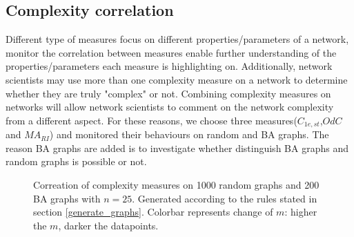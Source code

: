 \documentclass[12pt]{article}
\begin{document}
\subsection{Complexity correlation}
Different type of measures focus on different properties/parameters of a network, monitor the correlation between measures enable further understanding of the properties/parameters each measure is highlighting on. Additionally, network scientists may use more than one complexity measure on a network to determine whether they are truly "complex" or not. Combining complexity measures on networks will allow network scientists to comment on the network complexity from a different aspect. For these reasons, we choose three measures($C_{1e,st}$,$OdC$ and $MA_{RI}$) and monitored their behaviours on random and BA graphs. The reason BA graphs are added is to investigate whether distinguish BA graphs and random graphs is possible or not.\\
\begin{figure}[h!]
    \caption{Correation of complexity measures on 1000 random graphs and 200 BA graphs with $n=25$. Generated according to the rules stated in section \ref{generate_graphs}. Colorbar represents change of $m$: higher the $m$, darker the datapoints.}
    \label{fig:correlation}
\end{figure}
\end{document}
